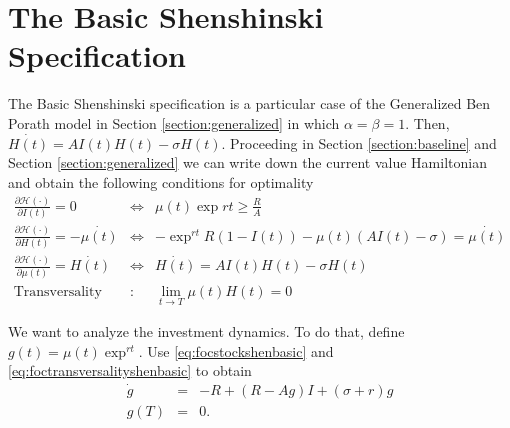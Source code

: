 \section{The Basic Shenshinski Specification}
The Basic Shenshinski specification is a particular case of the Generalized Ben Porath model in Section \ref{section:generalized} in which $\alpha = \beta = 1$. Then, $\dot{H(t)} = AI(t)H(t) - \sigma H(t)$. Proceeding in Section \ref{section:baseline} and Section \ref{section:generalized} we can write down the current value Hamiltonian and obtain the following conditions for optimality
\begin{eqnarray}
\frac{\partial \mathcal{H} (\cdot)}{\partial I(t)} = 0 &\Leftrightarrow& \mu(t) \exp{rt} \geq \frac{R}{A} \label{eq:focinvestmentshenbasic} \\
\frac{\partial \mathcal{H} (\cdot)}{\partial H(t)} = - \dot{\mu(t)} &\Leftrightarrow& - \exp^{rt} R(1 - I(t)) - \mu(t) \left( A I(t) - \sigma \right) = \dot{\mu(t)} \label{eq:focstockshenbasic} \\ 
\frac{\partial \mathcal{H} (\cdot)}{\partial \mu(t)} = \dot{H(t)} &\Leftrightarrow& \dot{H(t)} =  A I(t) H(t)- \sigma H(t) \label{eq:focmotionshenbasic} \\
\text{Transversality} &:& \lim_{t \rightarrow T} \mu(t) H(t) = 0 \label{eq:foctransversalityshenbasic}
\end{eqnarray}

\indent We want to analyze the investment dynamics. To do that, define $g(t) = \mu(t) \exp^{rt}$. Use \eqref{eq:focstockshenbasic} and \eqref{eq:foctransversalityshenbasic} to obtain
\begin{eqnarray}
\dot{g} &=& -R + (R - Ag)I + (\sigma + r)g \label{eq:gbasicshen} \\ 
g(T) &=& 0.
\end{eqnarray}

